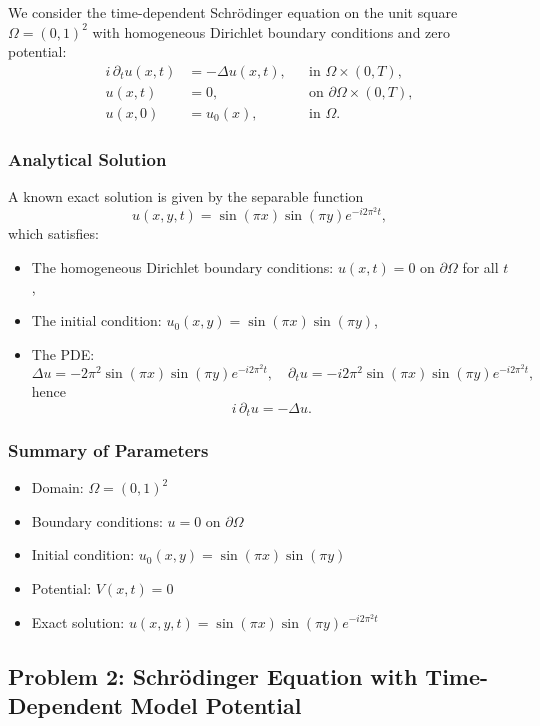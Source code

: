 \documentclass{article}
\theoremstyle{definition}
\theoremstyle{plain}
\theoremstyle{remark}
\begin{document}
We consider the time-dependent Schrödinger equation on the unit square $\Omega = (0,1)^2$ with homogeneous Dirichlet boundary conditions and zero potential:
\begin{align*}
i \, \partial_t u(x,t) &= -\Delta u(x,t), &&\text{in } \Omega \times (0,T), \\
u(x,t) &= 0, &&\text{on } \partial \Omega \times (0,T), \\
u(x,0) &= u_0(x), &&\text{in } \Omega.
\end{align*}

\subsubsection*{Analytical Solution}

A known exact solution is given by the separable function
\[
u(x,y,t) = \sin(\pi x)\sin(\pi y) e^{-i 2\pi^2 t},
\]
which satisfies:
\begin{itemize}
  \item The homogeneous Dirichlet boundary conditions: $u(x,t) = 0$ on $\partial \Omega$ for all $t$,
  \item The initial condition: $u_0(x,y) = \sin(\pi x)\sin(\pi y)$,
  \item The PDE:
  \[
  \Delta u = -2\pi^2 \sin(\pi x)\sin(\pi y) e^{-i 2\pi^2 t}, \quad
  \partial_t u = -i 2\pi^2 \sin(\pi x)\sin(\pi y) e^{-i 2\pi^2 t},
  \]
  hence
  \[
  i \, \partial_t u = -\Delta u.
  \]
\end{itemize}

\subsubsection*{Summary of Parameters}

\begin{itemize}
  \item Domain: $\Omega = (0,1)^2$
  \item Boundary conditions: $u = 0$ on $\partial \Omega$
  \item Initial condition: $u_0(x,y) = \sin(\pi x)\sin(\pi y)$
  \item Potential: $V(x,t) = 0$
  \item Exact solution: $u(x,y,t) = \sin(\pi x)\sin(\pi y) e^{-i 2\pi^2 t}$
\end{itemize}

\subsection*{Problem 2: Schrödinger Equation with Time-Dependent Model Potential}
\end{document}
